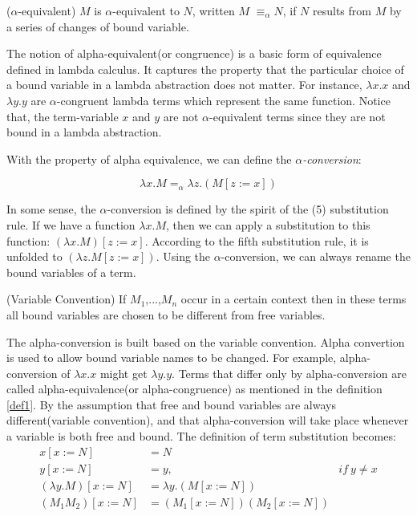 \begin{def1}\label{def1}
($\alpha$-equivalent) $M$ is $\alpha$-equivalent to $N$, written $M$ $\equiv_\alpha N$, if $N$ results from $M$ by a series of changes of bound variable.
\end{def1}

The notion of alpha-equivalent(or congruence) is a basic form of equivalence defined in lambda calculus. It captures the property that the particular choice of a bound variable in a lambda abstraction does not matter. For instance, $\lambda x.x$ and $\lambda y.y$ are $\alpha$-congruent lambda terms which represent the same function. Notice that, the term-variable $x$ and $y$ are not $\alpha$-equivalent terms since they are not bound in a lambda abstraction.

With the property of alpha equivalence, we can define the \textit{$\alpha$-conversion}:

\begin{equation*}
\lambda x.M =_\alpha \lambda z.(M[z:=x])
\end{equation*}

In some sense, the $\alpha$-conversion is defined by the spirit of the (5) substitution rule. If we have a function $\lambda x.M$, then we can apply a substitution to this function: $(\lambda x.M)[z:=x]$. According to the fifth substitution rule, it is unfolded to $(\lambda z.M[z:=x])$. Using the $\alpha$-conversion, we can always rename the bound variables of a term. 

\begin{def1}
(Variable Convention) If $M_1$,...,$M_n$ occur in a certain context then in these terms all bound variables are chosen to be different from free variables.
\end{def1}

The alpha-conversion is built based on the variable convention. Alpha convertion is used to allow bound variable names to be changed. For example, alpha-conversion of $\lambda x.x$ might get $\lambda y.y$. Terms that differ only by alpha-conversion are called alpha-equivalence(or alpha-congruence) as mentioned in the definition \ref{def1}. By the assumption that free and bound variables are always different(variable convention), and that alpha-conversion will take place whenever a variable is both free and bound. The definition of term substitution becomes:
\begin{equation*}
\begin{array}{rll}
x[x:=N]&=N & ~\\
y[x:=N]&=y,& if\ y\neq x\\
(\lambda y.M)[x:=N]&=\lambda y.(M[x:=N])& \\
(M_1M_2)[x:=N] &= (M_1[x:=N])(M_2[x:=N])&
\end{array} 
\end{equation*}

